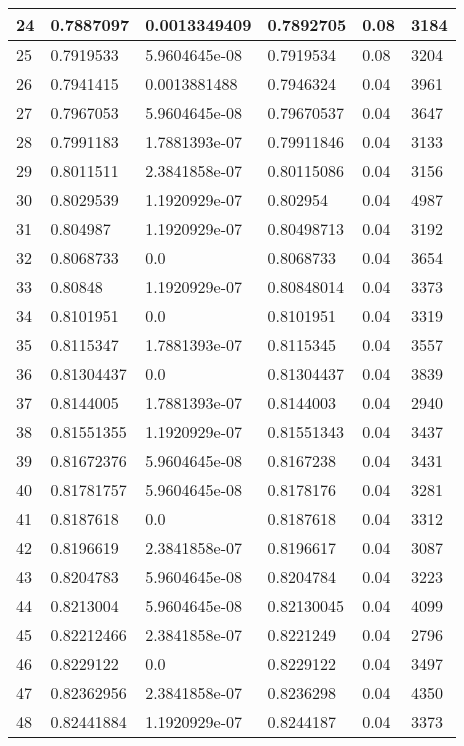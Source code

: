 \begin{longtable}{|l|l|l|l|l|l|}
24 & 0.7887097 & 0.0013349409 & 0.7892705 & 0.08 & 3184 \\ \hline 
25 & 0.7919533 & 5.9604645e-08 & 0.7919534 & 0.08 & 3204 \\ \hline 
26 & 0.7941415 & 0.0013881488 & 0.7946324 & 0.04 & 3961 \\ \hline 
27 & 0.7967053 & 5.9604645e-08 & 0.79670537 & 0.04 & 3647 \\ \hline 
28 & 0.7991183 & 1.7881393e-07 & 0.79911846 & 0.04 & 3133 \\ \hline 
29 & 0.8011511 & 2.3841858e-07 & 0.80115086 & 0.04 & 3156 \\ \hline 
30 & 0.8029539 & 1.1920929e-07 & 0.802954 & 0.04 & 4987 \\ \hline 
31 & 0.804987 & 1.1920929e-07 & 0.80498713 & 0.04 & 3192 \\ \hline 
32 & 0.8068733 & 0.0 & 0.8068733 & 0.04 & 3654 \\ \hline 
33 & 0.80848 & 1.1920929e-07 & 0.80848014 & 0.04 & 3373 \\ \hline 
34 & 0.8101951 & 0.0 & 0.8101951 & 0.04 & 3319 \\ \hline 
35 & 0.8115347 & 1.7881393e-07 & 0.8115345 & 0.04 & 3557 \\ \hline 
36 & 0.81304437 & 0.0 & 0.81304437 & 0.04 & 3839 \\ \hline 
37 & 0.8144005 & 1.7881393e-07 & 0.8144003 & 0.04 & 2940 \\ \hline 
38 & 0.81551355 & 1.1920929e-07 & 0.81551343 & 0.04 & 3437 \\ \hline 
39 & 0.81672376 & 5.9604645e-08 & 0.8167238 & 0.04 & 3431 \\ \hline 
40 & 0.81781757 & 5.9604645e-08 & 0.8178176 & 0.04 & 3281 \\ \hline 
41 & 0.8187618 & 0.0 & 0.8187618 & 0.04 & 3312 \\ \hline 
42 & 0.8196619 & 2.3841858e-07 & 0.8196617 & 0.04 & 3087 \\ \hline 
43 & 0.8204783 & 5.9604645e-08 & 0.8204784 & 0.04 & 3223 \\ \hline 
44 & 0.8213004 & 5.9604645e-08 & 0.82130045 & 0.04 & 4099 \\ \hline 
45 & 0.82212466 & 2.3841858e-07 & 0.8221249 & 0.04 & 2796 \\ \hline 
46 & 0.8229122 & 0.0 & 0.8229122 & 0.04 & 3497 \\ \hline 
47 & 0.82362956 & 2.3841858e-07 & 0.8236298 & 0.04 & 4350 \\ \hline 
48 & 0.82441884 & 1.1920929e-07 & 0.8244187 & 0.04 & 3373 \\ \hline 

\end{longtable}
